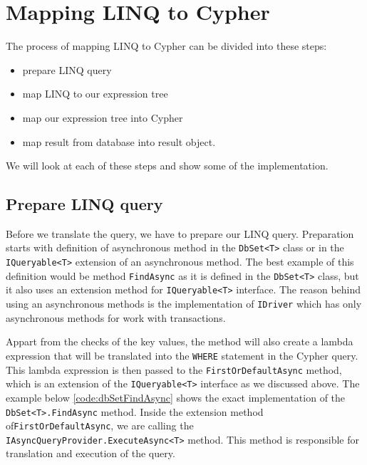\section{Mapping LINQ to Cypher}

The process of mapping LINQ to Cypher can be divided into these steps:
\begin{itemize}
    \item {prepare LINQ query}
    \item {map LINQ to our expression tree}
    \item {map our expression tree into Cypher}
    \item {map result from database into result object.}
\end{itemize}
We will look at each of these steps and show some of the implementation.

\subsection{Prepare LINQ query}

Before we translate the query, we have to prepare our LINQ query. Preparation starts with definition of asynchronous method in the \texttt{DbSet<T>} class
or in the \texttt{IQueryable<T>} extension of an asynchronous method. The best example of this definition would be method \texttt{FindAsync} as it is defined
in the \texttt{DbSet<T>} class, but it also uses an extension method for \texttt{IQueryable<T>} interface. The reason behind using an asynchronous methods is
the implementation of \texttt{IDriver} which has only asynchronous methods for work with transactions.

Appart from the checks of the key values, the method will also create a lambda expression that will be translated into the \texttt{WHERE} statement
in the Cypher query. This lambda expression is then passed to the \texttt{FirstOrDefaultAsync} method, which is an extension of the \texttt{IQueryable<T>} interface
as we discussed above. The example below \ref{code:dbSetFindAsync} shows the exact implementation of the \texttt{DbSet<T>.FindAsync} method.
Inside the extension method of\linebreak\texttt{FirstOrDefaultAsync}, we are calling the \texttt{IAsyncQueryProvider.ExecuteAsync<T>} method. This method
is responsible for translation and execution of the query.


